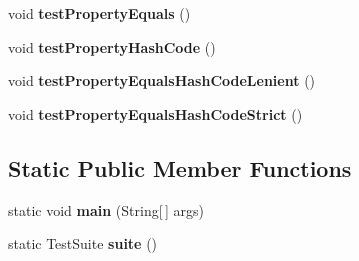 \begin{DoxyCompactItemize}
\item 
\hypertarget{classorg_1_1joda_1_1time_1_1_test_month_day___properties_a8f3b845728b1ab0383331cbb01755607}{void {\bfseries test\-Property\-Equals} ()}\label{classorg_1_1joda_1_1time_1_1_test_month_day___properties_a8f3b845728b1ab0383331cbb01755607}

\item 
\hypertarget{classorg_1_1joda_1_1time_1_1_test_month_day___properties_aadd81c6b69d123934b8824b53200a475}{void {\bfseries test\-Property\-Hash\-Code} ()}\label{classorg_1_1joda_1_1time_1_1_test_month_day___properties_aadd81c6b69d123934b8824b53200a475}

\item 
\hypertarget{classorg_1_1joda_1_1time_1_1_test_month_day___properties_a23a305e8c789da865843973beb39036b}{void {\bfseries test\-Property\-Equals\-Hash\-Code\-Lenient} ()}\label{classorg_1_1joda_1_1time_1_1_test_month_day___properties_a23a305e8c789da865843973beb39036b}

\item 
\hypertarget{classorg_1_1joda_1_1time_1_1_test_month_day___properties_ac293b7b627481d27df47e73f6326843e}{void {\bfseries test\-Property\-Equals\-Hash\-Code\-Strict} ()}\label{classorg_1_1joda_1_1time_1_1_test_month_day___properties_ac293b7b627481d27df47e73f6326843e}

\end{DoxyCompactItemize}
\subsection*{Static Public Member Functions}
\begin{DoxyCompactItemize}
\item 
\hypertarget{classorg_1_1joda_1_1time_1_1_test_month_day___properties_ace272fd8aa4e24b96bc169a61f2f0def}{static void {\bfseries main} (String\mbox{[}$\,$\mbox{]} args)}\label{classorg_1_1joda_1_1time_1_1_test_month_day___properties_ace272fd8aa4e24b96bc169a61f2f0def}

\item 
\hypertarget{classorg_1_1joda_1_1time_1_1_test_month_day___properties_a849c518f0a0c59d71fe39826bf3f5256}{static Test\-Suite {\bfseries suite} ()}\label{classorg_1_1joda_1_1time_1_1_test_month_day___properties_a849c518f0a0c59d71fe39826bf3f5256}

\end{DoxyCompactItemize}
